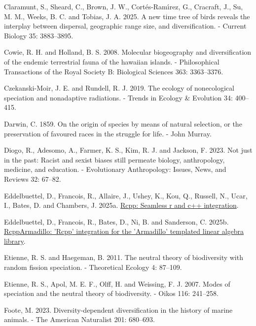 \documentclass[
  letterpaper,
  DIV=11,
  numbers=noendperiod]{scrartcl}
\newlength{\cslhangindent}
\newenvironment{CSLReferences}[2] %
 {\begin{list}{}{%
  \setlength{\itemindent}{0pt}
  \setlength{\leftmargin}{0pt}
  \setlength{\parsep}{0pt}
  \ifodd #1
   \setlength{\leftmargin}{\cslhangindent}
   \setlength{\itemindent}{-1\cslhangindent}
  \fi
  \setlength{\itemsep}{#2\baselineskip}}}
 {\end{list}}
\begin{document}
\begin{CSLReferences}{1}{1}
Claramunt, S., Sheard, C., Brown, J. W., Cortés-Ramı́rez, G., Cracraft,
J., Su, M. M., Weeks, B. C. and Tobias, J. A. 2025. A new time tree of
birds reveals the interplay between dispersal, geographic range size,
and diversification. - Current Biology 35: 3883--3895.

Cowie, R. H. and Holland, B. S. 2008. Molecular biogeography and
diversification of the endemic terrestrial fauna of the hawaiian
islands. - Philosophical Transactions of the Royal Society B: Biological
Sciences 363: 3363--3376.

Czekanski-Moir, J. E. and Rundell, R. J. 2019. The ecology of
nonecological speciation and nonadaptive radiations. - Trends in Ecology
\& Evolution 34: 400--415.

Darwin, C. 1859. On the origin of species by means of natural selection,
or the preservation of favoured races in the struggle for life. - John
Murray.

Diogo, R., Adesomo, A., Farmer, K. S., Kim, R. J. and Jackson, F. 2023.
Not just in the past: Racist and sexist biases still permeate biology,
anthropology, medicine, and education. - Evolutionary Anthropology:
Issues, News, and Reviews 32: 67--82.

Eddelbuettel, D., Francois, R., Allaire, J., Ushey, K., Kou, Q.,
Russell, N., Ucar, I., Bates, D. and Chambers, J. 2025a.
\href{https://doi.org/10.32614/CRAN.package.Rcpp}{Rcpp: Seamless r and
c++ integration}.

Eddelbuettel, D., Francois, R., Bates, D., Ni, B. and Sanderson, C.
2025b.
\href{https://doi.org/10.32614/CRAN.package.RcppArmadillo}{{RcppArmadillo}:
'{Rcpp}' integration for the '{Armadillo}' templated linear algebra
library}.

Etienne, R. S. and Haegeman, B. 2011. The neutral theory of biodiversity
with random fission speciation. - Theoretical Ecology 4: 87--109.

Etienne, R. S., Apol, M. E. F., Olff, H. and Weissing, F. J. 2007. Modes
of speciation and the neutral theory of biodiversity. - Oikos 116:
241--258.

Foote, M. 2023. Diversity-dependent diversification in the history of
marine animals. - The American Naturalist 201: 680--693.


\end{CSLReferences}
\end{document}
